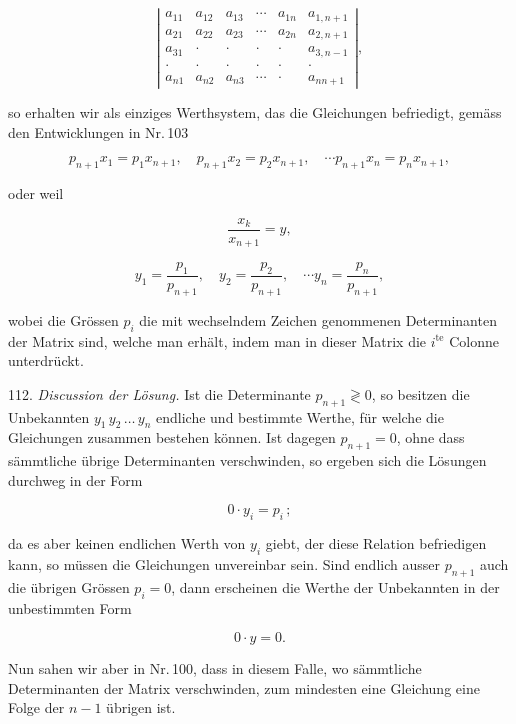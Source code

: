\[ \left| \begin{array}{cccccc}
a_{11} & a_{12} & a_{13} & \cdots & a_{1n} & a_{1,n+1}\\
a_{21} & a_{22} & a_{23} & \cdots & a_{2n} & a_{2,n+1}\\
a_{31} & \cdot & \cdot & \cdot & \cdot & a_{3,n-1}\\ %
\cdot & \cdot & \cdot & \cdot & \cdot & \cdot\\
a_{n1} & a_{n2} & a_{n3} & \cdots & \cdot & a_{nn+1} %
\end{array} \right|,\]

so erhalten wir als einziges Werthsystem, das die Gleichungen befriedigt, gemäss den Entwicklungen in Nr.\,103

\[ p_{n+1}x_1=p_1x_{n+1},\quad p_{n+1}x_2=p_2x_{n+1},\quad \cdots p_{n+1}x_n=p_nx_{n+1}, \]



oder weil

\[ \frac{x_k}{x_{n+1}} = y, \]

\[ y_1=\frac{p_1}{p_{n+1}},\quad y_2=\frac{p_2}{p_{n+1}},\quad \cdots y_n=\frac{p_n}{p_{n+1}}, \]

wobei die Grössen $p_i$ die mit wechselndem Zeichen genommenen Determinanten der Matrix sind, welche man erhält, indem man in dieser Matrix die $i^{\text{te}}$ Colonne unterdrückt.

112. \textit{Discussion der Lösung.} Ist die Determinante $p_{n+1}\gtrless 0$, so besitzen die Unbekannten $y_1\,y_2\,\ldots\,y_n$ endliche und bestimmte Werthe, für welche die Gleichungen zusammen bestehen können. Ist dagegen $p_{n+1}=0$, ohne dass sämmtliche übrige Determinanten verschwinden, so ergeben sich die Lösungen durchweg in der Form

\[ 0\cdot y_i = p_i\,; \]

da es aber keinen endlichen Werth von $y_i$ giebt, der diese Relation befriedigen kann, so müssen die Gleichungen unvereinbar sein. Sind endlich ausser $p_{n+1}$ auch die übrigen Grössen $p_i=0$, dann erscheinen die Werthe der Unbekannten in der unbestimmten Form

\[ 0\cdot y = 0. \]

Nun sahen wir aber in Nr.\,100, dass in diesem Falle, wo sämmtliche Determinanten der Matrix verschwinden, zum mindesten eine Gleichung eine Folge der $n-1$ übrigen ist.

